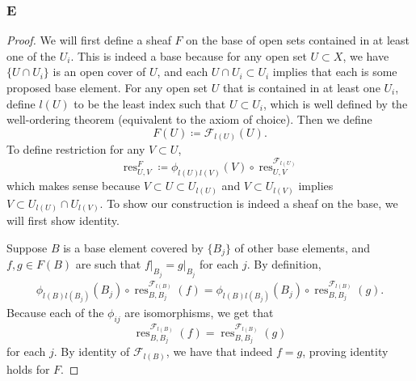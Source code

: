 \documentclass{article}
\newcommand{\fF}{\mathscr{F}}
\DeclareMathOperator{\res}{\mathrm{res}}
\begin{document}
\subsubsection{E}\label{2.5.E}
\begin{proof}
    We will first define a sheaf $F$ on the base of open sets contained in at least one of the $U_i$. This is indeed a base because for any open set $U\subset X$, we have $\{U\cap U_i\}$ is an open cover of $U$, and each $U\cap U_i\subset U_i$ implies that each is some proposed base element. For any open set $U$ that is contained in at least one $U_i$, define $l(U)$ to be the least index such that $U\subset U_i$, which is well defined by the well-ordering theorem (equivalent to the axiom of choice). Then we define
    \[
    F(U)\coloneqq \fF_{l(U)} (U).
    \]
    To define restriction for any $V\subset U$, 
    \[
    \res_{U,V}^F\coloneqq \phi_{l(U)l(V)}(V)\circ \res_{U,V}^{\fF_{l(U)}}
    \]
    which makes sense because $V\subset U\subset U_{l(U)}$ and $V\subset U_{l(V)}$ implies $V\subset U_{l(U)}\cap U_{l(V)}$. To show our construction is indeed a sheaf on the base, we will first show identity.

    \vspace{0.1in}
    Suppose $B$ is a base element covered by $\{B_j\}$ of other base elements, and $f,g\in F(B)$ are such that $f\vert_{B_j}=g\vert_{B_j}$ for each $j$. By definition,
    \begin{align*}
        \phi_{l(B)l(B_j)}(B_j)\circ \res_{B,B_j}^{\fF_{l(B)}}(f)=\phi_{l(B)l(B_j)}(B_j)\circ \res_{B,B_j}^{\fF_{l(B)}}(g).
    \end{align*}
    Because each of the $\phi_{ij}$ are isomorphisms, we get that
    \[
    \res_{B,B_j}^{\fF_{l(B)}}(f)=\res_{B,B_j}^{\fF_{l(B)}}(g)
    \]
    for each $j$. By identity of $\fF_{l(B)}$, we have that indeed $f=g$, proving identity holds for $F$.


\end{proof}
\end{document}
